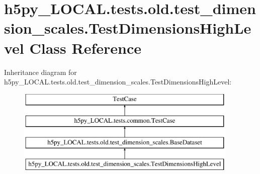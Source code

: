 \hypertarget{classh5py__LOCAL_1_1tests_1_1old_1_1test__dimension__scales_1_1TestDimensionsHighLevel}{}\section{h5py\+\_\+\+L\+O\+C\+A\+L.\+tests.\+old.\+test\+\_\+dimension\+\_\+scales.\+Test\+Dimensions\+High\+Level Class Reference}
\label{classh5py__LOCAL_1_1tests_1_1old_1_1test__dimension__scales_1_1TestDimensionsHighLevel}
Inheritance diagram for h5py\+\_\+\+L\+O\+C\+A\+L.\+tests.\+old.\+test\+\_\+dimension\+\_\+scales.\+Test\+Dimensions\+High\+Level\+:\begin{figure}[H]
\begin{center}
\leavevmode
\includegraphics[height=4.000000cm]{classh5py__LOCAL_1_1tests_1_1old_1_1test__dimension__scales_1_1TestDimensionsHighLevel}
\end{center}
\end{figure}
